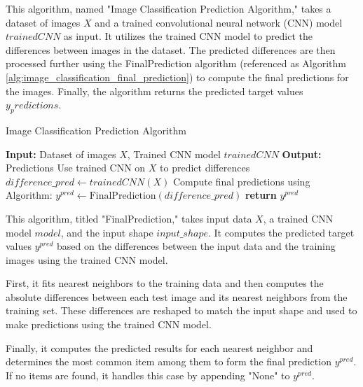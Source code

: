 \documentclass[a4paper, 12pt]{report}
\begin{document}
This algorithm, named "Image Classification Prediction Algorithm," takes a dataset of images $X$ and a trained convolutional neural network 
(CNN) model $trainedCNN$ as input. It utilizes the trained CNN model to predict the differences between images in the dataset. 
The predicted differences are then processed further using the FinalPrediction algorithm (referenced as Algorithm \ref{alg:image_classification_final_prediction}) 
to compute the final predictions for the images. Finally, the algorithm returns the predicted target values $y_predictions$.
\begin{algorithm}
    \caption{Image Classification Prediction Algorithm}
    \label{alg:image_classification_prediction}
    \begin{algorithmic}[1]
            \State \textbf{Input:} Dataset of images $X$, Trained CNN model $trainedCNN$
            \State \textbf{Output:} Predictions 
            \State Use trained CNN on $X$ to predict differences
            \State $difference\_pred \gets trainedCNN(X)$
            \State Compute final predictions using Algorithm: $y^{pred} \gets \text{FinalPrediction}(difference\_pred)$ 
            \State \textbf{return} $y^{pred}$
        \EndFunction
    \end{algorithmic}
\end{algorithm}

This algorithm, titled "FinalPrediction," takes input data $X$, a trained CNN model $model$, and the input shape $input\_shape$. 
It computes the predicted target values $y^{pred}$ based on the differences between the input data and the training images using the trained CNN model.

First, it fits nearest neighbors to the training data and then computes the absolute differences between each test image 
and its nearest neighbors from the training set. These differences are reshaped to match the input shape and used to make predictions using the trained CNN model.

Finally, it computes the predicted results for each nearest neighbor and determines the most common item among them to form the 
final prediction $y^{pred}$. If no items are found, it handles this case by appending "None" to $y^{pred}$.
\end{document}
